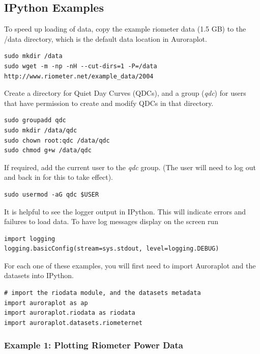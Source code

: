 \documentclass{article}
\begin{document}
\subsection{IPython Examples}

To speed up loading of data, copy the example riometer data (1.5 GB) to the /data directory, which is the default data location in Auroraplot.

\begin{lstlisting}
sudo mkdir /data
sudo wget -m -np -nH --cut-dirs=1 -P=/data http://www.riometer.net/example_data/2004
\end{lstlisting}

Create a directory for Quiet Day Curves (QDCs), and a group ({\it qdc}) for users that have permission to create and modify QDCs in that directory.

\begin{lstlisting}
sudo groupadd qdc
sudo mkdir /data/qdc
sudo chown root:qdc /data/qdc
sudo chmod g+w /data/qdc
\end{lstlisting}

If required, add the current user to the {\it qdc} group. (The user will need to log out and back in for this to take effect).

\begin{lstlisting}
sudo usermod -aG qdc $USER
\end{lstlisting}

It is helpful to see the logger output in IPython. This will indicate errors and failures to load data. To have log messages display on the screen run

\begin{lstlisting}[style=pythonstyle]
import logging
logging.basicConfig(stream=sys.stdout, level=logging.DEBUG)
\end{lstlisting}

For each one of these examples, you will first need to import Auroraplot and the datasets into IPython.

\begin{lstlisting}[style=pythonstyle]
# import the riodata module, and the datasets metadata
import auroraplot as ap
import auroraplot.riodata as riodata
import auroraplot.datasets.riometernet
\end{lstlisting}


\subsubsection{Example 1: Plotting Riometer Power Data}
\end{document}

